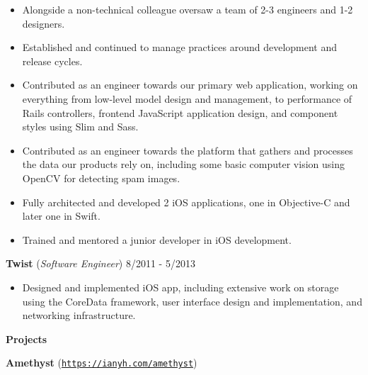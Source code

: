 \documentclass{article}
\begin{document}
\begin{adjustwidth}{3mm}{5mm}
	\begin{itemize}
		\setlength\itemsep{-0.25mm}
		\item Alongside a non-technical colleague oversaw a team of 2-3 engineers and 1-2 designers.
		\item Established and continued to manage practices around development and release cycles.
		\item Contributed as an engineer towards our primary web application, working on everything from low-level model design and management, to performance of Rails controllers, frontend JavaScript application design, and component styles using Slim and Sass.
		\item Contributed as an engineer towards the platform that gathers and processes the data our products rely on, including some basic computer vision using OpenCV for detecting spam images.
		\item Fully architected and developed 2 iOS applications, one in Objective-C and later one in Swift.
		\item Trained and mentored a junior developer in iOS development.
	\end{itemize}
\end{adjustwidth}

\vspace{3mm}

{
	\hspace{2mm}
	{\bf Twist}
	({\em Software Engineer})
	\hfill
	8/2011 - 5/2013
}

\vspace{1mm}

\begin{adjustwidth}{3mm}{5mm}
	\begin{itemize}
		\setlength\itemsep{-0.25mm}
		\item Designed and implemented iOS app, including extensive work on storage using the CoreData framework, user interface design and implementation, and networking infrastructure.
	\end{itemize}
\end{adjustwidth}

\vspace{3mm}

{\large\bf Projects}\\

\vspace{-2mm}

{
	\hspace{2mm}
	{\bf Amethyst}
	(\href{https://ianyh.com/amethyst}{\tt https://ianyh.com/amethyst})
}
\end{document}
